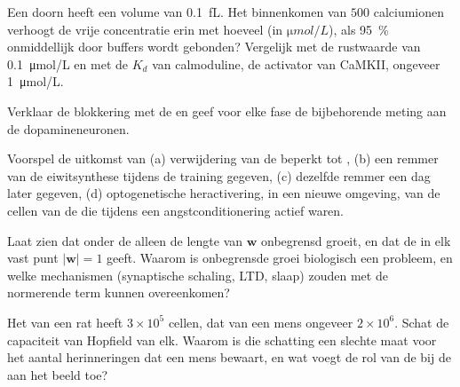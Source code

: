 \begin{exercise}[$\star\star$]\label{exo:b3:learning-memory:7}
Een doorn heeft een volume van \qty{0.1}{fL}. Het binnenkomen van $500$
calciumionen verhoogt de vrije concentratie erin met hoeveel (in
$\unit{\micro mol/L}$), als \qty{95}{\%} onmiddellijk door buffers
wordt gebonden? Vergelijk met de rustwaarde van
\qty{0.1}{\micro mol/L} en met de $K_{d}$ van calmoduline, de activator
van CaMKII, ongeveer \qty{1}{\micro mol/L}.
\end{exercise}

\begin{exercise}[$\star\star$]\label{exo:b3:learning-memory:8}
Verklaar de blokkering met de  en geef voor
elke fase de bijbehorende meting aan de dopamineneuronen.
\end{exercise}

\begin{exercise}[$\star\star$]\label{exo:b3:learning-memory:9}
Voorspel de uitkomst van (a) verwijdering van de  beperkt
tot , (b) een remmer van de eiwitsynthese tijdens de training
gegeven, (c) dezelfde remmer een dag later gegeven, (d) optogenetische
heractivering, in een nieuwe omgeving, van de cellen van de  die tijdens een angstconditionering actief waren.
\end{exercise}

\begin{exercise}[$\star\star\star$]\label{exo:b3:learning-memory:10}
Laat zien dat onder de  alleen de lengte van
$\mathbf{w}$ onbegrensd groeit, en dat de  in elk vast
punt $|\mathbf{w}| = 1$ geeft. Waarom is onbegrensde groei biologisch
een probleem, en welke mechanismen (synaptische schaling, LTD, slaap)
zouden met de normerende term kunnen overeenkomen?
\end{exercise}

\begin{exercise}[$\star\star\star$]\label{exo:b3:learning-memory:11}
Het  van een rat heeft $3\times 10^{5}$ cellen, dat van een mens
ongeveer $2\times 10^{6}$. Schat de capaciteit van Hopfield van elk.
Waarom is die schatting een slechte maat voor het aantal herinneringen
dat een mens bewaart, en wat voegt de rol van de  bij de
 aan het beeld toe?
\end{exercise}

